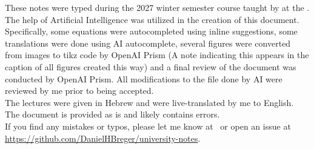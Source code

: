 \begin{myminipage}
	These notes were typed during the 2027 winter semester \textit{\courseloc} course taught by \profloc{} at the \instituteloc{}. 
	\bigskip \\ The help of Artificial Intelligence was utilized in the creation of this document. Specifically, some equations were autocompleted using inline suggestions, some translations were done using AI autocomplete, several figures were converted from images to tikz code by OpenAI Prism (A note indicating this appears in the caption of all figures created this way) and a final review of the document was conducted by OpenAI Prism. All modifications to the file done by AI were reviewed by me prior to being accepted. \bigskip \\ The lectures were given in Hebrew and were live-translated by me to English. The document is provided as is and likely contains errors. 
	\bigskip \\ If you find any mistakes or typos, please let me know at \myemailloc\ or open an issue at \url{https://github.com/DanielHBreger/university-notes}.
\end{myminipage}
